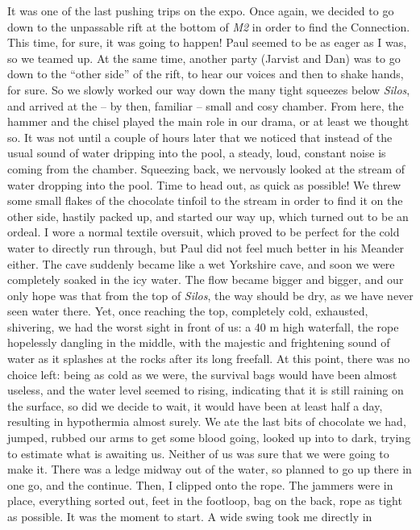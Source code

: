It was one of the last pushing trips on the expo. Once again, we decided
to go down to the unpassable rift at the bottom of \emph{M2} in order to
find the Connection. This time, for sure, it was going to happen! Paul
seemed to be as eager as I was, so we teamed up. At the same time,
another party (Jarvist and Dan) was to go down to the ``other side'' of
the rift, to hear our voices and then to shake hands, for sure. So we
slowly worked our way down the many tight squeezes below \emph{Silos},
and arrived at the -- by then, familiar -- small and cosy chamber. From
here, the hammer and the chisel played the main role in our drama, or at
least we thought so. It was not until a couple of hours later that we
noticed that instead of the usual sound of water dripping into the pool,
a steady, loud, constant noise is coming from the chamber. Squeezing
back, we nervously looked at the stream of water dropping into the pool.
Time to head out, as quick as possible! We threw some small flakes of
the chocolate tinfoil to the stream in order to find it on the other
side, hastily packed up, and started our way up, which turned out to be
an ordeal. I wore a normal textile oversuit, which proved to be perfect
for the cold water to directly run through, but Paul did not feel much
better in his Meander either. The cave suddenly became like a wet
Yorkshire cave, and soon we were completely soaked in the icy water. The
flow became bigger and bigger, and our only hope was that from the top
of \emph{Silos}, the way should be dry, as we have never seen water
there. Yet, once reaching the top, completely cold, exhausted,
shivering, we had the worst sight in front of us: a 40 m high waterfall,
the rope hopelessly dangling in the middle, with the majestic and
frightening sound of water as it splashes at the rocks after its long
freefall. At this point, there was no choice left: being as cold as we
were, the survival bags would have been almost useless, and the water
level seemed to rising, indicating that it is still raining on the
surface, so did we decide to wait, it would have been at least half a
day, resulting in hypothermia almost surely. We ate the last bits of
chocolate we had, jumped, rubbed our arms to get some blood going,
looked up into to dark, trying to estimate what is awaiting us. Neither
of us was sure that we were going to make it. There was a ledge midway
out of the water, so planned to go up there in one go, and the continue.
Then, I clipped onto the rope. The jammers were in place, everything
sorted out, feet in the footloop, bag on the back, rope as tight as
possible. It was the moment to start. A wide swing took me directly in
